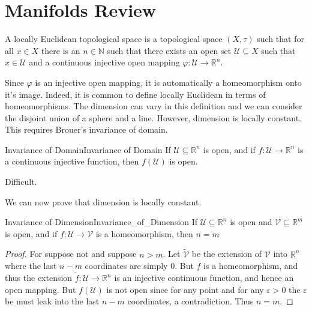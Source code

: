 \documentclass{article}                                                        %
\begin{document}
    \section{Manifolds Review}
        \begin{definition}
            A locally Euclidean topological space is a topological space
            $(X,\tau)$ such that for all $x\in{X}$ there is an $n\in\mathbb{N}$
            such that there exists an open set $\mathcal{U}\subseteq{X}$ such
            that $x\in\mathcal{U}$ and a continuous injective open mapping
            $\varphi:\mathcal{U}\rightarrow\mathbb{R}^{n}$.
        \end{definition}
        Since $\varphi$ is an injective open mapping, it is automatically a
        homeomorphism onto it's image. Indeed, it is common to define locally
        Euclidean in terms of homeomorphisms. The dimension can vary in this
        definition and we can consider the disjoint union of a sphere and a
        line. However, dimension is locally constant. This requires Brouer's
        invariance of domain.
        \begin{ftheorem}{Invariance of Domain}{Invariance of Domain}
            If $\mathcal{U}\subseteq\mathbb{R}^{n}$ is open, and if
            $f:\mathcal{U}\rightarrow\mathbb{R}^{n}$ is a continuous injective
            function, then $f(\mathcal{U})$ is open.
        \end{ftheorem}
        \begin{bproof}
            Difficult.
        \end{bproof}
        We can now prove that dimension is locally constant.
        \begin{ltheorem}{Invariance of Dimension}{Invariance_of_Dimension}
            If $\mathcal{U}\subseteq\mathbb{R}^{n}$ is open and
            $\mathcal{V}\subseteq\mathbb{R}^{m}$ is open, and if
            $f:\mathcal{U}\rightarrow\mathcal{V}$ is a homeomorphism, then
            $n=m$
        \end{ltheorem}
        \begin{proof}
            For suppose not and suppose $n>m$. Let $\tilde{\mathcal{V}}$ be the
            extension of $\mathcal{V}$ into $\mathbb{R}^{n}$ where the last
            $n-m$ coordinates are simply 0. But $f$ is a homeomorphism, and thus
            the extension $\tilde{f}:\mathcal{U}\rightarrow\mathbb{R}^{n}$ is
            an injective continuous function, and hence an open mapping.
            But $f(\mathcal{U})$ is not open since for any point and for any
            $\varepsilon>0$ the $\varepsilon$ be must leak into the last
            $n-m$ coordinates, a contradiction. Thus $n=m$.
        \end{proof}
\end{document}
